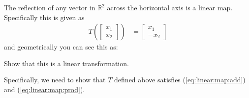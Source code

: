 \begin{example} \label{ex:reflect:map}

The reflection of any vector in $\mathbb{R}^2$ across the horizontal axis is a linear map.  Specifically this is given as
%
\begin{align*}
T(\begin{bmatrix}
x_1 \\ x_2
\end{bmatrix}) & = \begin{bmatrix}
x_1 \\ -x_2 
\end{bmatrix}
\end{align*}
and geometrically you can see this as:
%
\begin{center}
\end{center}

Show that this is a linear transformation. 

\solution

Specifically, we need to show that $T$ defined above satisfies (\ref{eq:linear:map:add}) and (\ref{eq:linear:map:prod}).  


\end{example}
